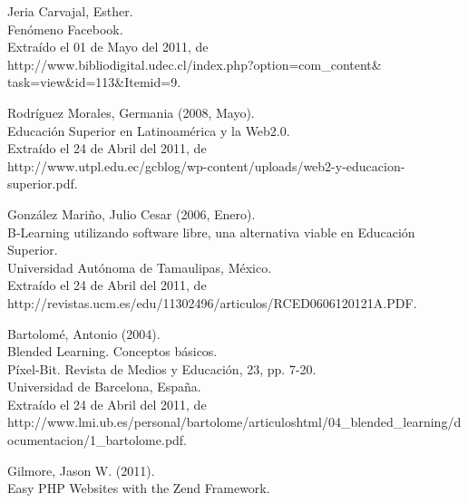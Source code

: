\begin{thebibliography}{99}

 Jeria Carvajal, Esther.\\
Fenómeno Facebook.\\
Extraído el 01 de Mayo del 2011, de\\
http://www.bibliodigital.udec.cl/index.php?option=com\_content\& task=view\&id=113\&Itemid=9.

 Rodríguez Morales, Germania (2008, Mayo).\\
Educación Superior en Latinoamérica y la Web2.0.\\
Extraído el 24 de Abril del 2011, de\\
http://www.utpl.edu.ec/gcblog/wp-content/uploads/web2-y-educacion-superior.pdf.

 González Mariño, Julio Cesar (2006, Enero).\\
B-Learning utilizando software libre, una alternativa viable en Educación Superior.\\
Universidad Autónoma de Tamaulipas, México.\\
Extraído el 24 de Abril del 2011, de\\
http://revistas.ucm.es/edu/11302496/articulos/RCED0606120121A.PDF.

 Bartolomé, Antonio (2004).\\
Blended Learning. Conceptos básicos.\\
Píxel-Bit. Revista de Medios y Educación, 23, pp. 7-20.\\
Universidad de Barcelona, España.\\
Extraído el 24 de Abril del 2011, de\\
http://www.lmi.ub.es/personal/bartolome/articuloshtml/04\_blend\-ed\_learning/documentacion/1\_bartolome.pdf.

 Gilmore, Jason W. (2011).\\
Easy PHP Websites with the Zend Framework.\\

\end{thebibliography}
